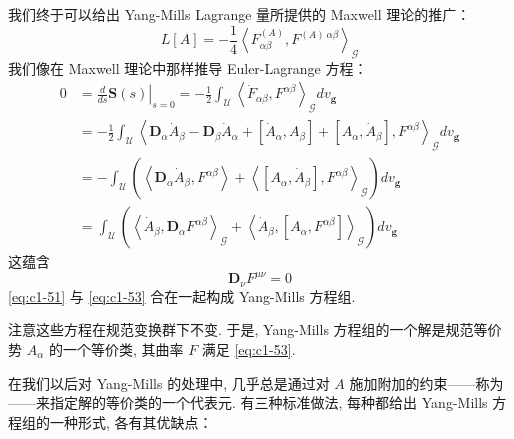 我们终于可以给出 Yang-Mills Lagrange 量所提供的 Maxwell 理论的推广：
\begin{equation}
L[A] = -\frac{1}{4}\left\langle F_{\alpha\beta}^{(A)}, F^{(A)\, \alpha\beta}\right\rangle_{\mathcal{G}}\label{eq:c1-52}
\end{equation}
我们像在 Maxwell 理论中那样推导 Euler-Lagrange 方程：
\[
\begin{aligned}
0 &= \left.\frac{d}{ds}\mathbf{S}(s)\right|_{s=0} = -\frac{1}{2}\int_{\mathcal{U}}\left\langle\dot{F}_{\alpha\beta}, F^{\alpha\beta}\right\rangle_{\mathcal{G}}dv_{\mathbf{g}}\\
&= -\frac{1}{2}\int_{\mathcal{U}}\left\langle\mathbf{D}_\alpha\dot{A}_\beta - \mathbf{D}_\beta\dot{A}_\alpha + [\dot{A}_\alpha, A_\beta] + [A_\alpha, \dot{A}_\beta], F^{\alpha\beta}\right\rangle_{\mathcal{G}}dv_{\mathbf{g}}\\
&= -\int_{\mathcal{U}}\left(\left\langle\mathbf{D}_\alpha\dot{A}_\beta, F^{\alpha\beta}\right\rangle + \left\langle[A_\alpha, \dot{A}_\beta], F^{\alpha\beta}\right\rangle_{\mathcal{G}}\right)dv_{\mathbf{g}}\\
&= \int_{\mathcal{U}}\left(\left\langle\dot{A}_\beta, \mathbf{D}_\alpha F^{\alpha\beta}\right\rangle_{\mathcal{G}} + \left\langle\dot{A}_\beta, [A_\alpha, F^{\alpha\beta}]\right\rangle_{\mathcal{G}}\right)dv_{\mathbf{g}}
\end{aligned}
\]
这蕴含
\begin{equation}
\mathbf{D}_\nu F^{\mu\nu} = 0\label{eq:c1-53}
\end{equation}
\eqref{eq:c1-51} 与 \eqref{eq:c1-53} 合在一起构成 Yang-Mills 方程组. 

注意这些方程在规范变换群下不变. 于是, Yang-Mills 方程组的一个解是规范等价势 $A_\alpha$ 的一个等价类, 其曲率 $F$ 满足 \eqref{eq:c1-53}. 

在我们以后对 Yang-Mills 的处理中, 几乎总是通过对 $A$ 施加附加的约束——称为 ——来指定解的等价类的一个代表元. 有三种标准做法, 每种都给出 Yang-Mills 方程组的一种形式, 各有其优缺点：


